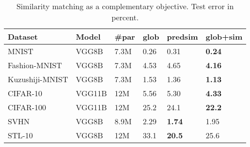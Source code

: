 \documentclass{article}
\begin{document}
\begin{table}[h]
  \caption{Similarity matching as a complementary objective. Test error in percent.}
  \label{table:complementary_sim}
  \centering
  \begin{tabular}{llllll}
    \toprule
    Dataset   & Model & \#par & glob & predsim & glob+sim  \\
    \midrule
    MNIST           & VGG8B & 7.3M & 0.26  & 0.31 & \textbf{0.24} \\
    Fashion-MNIST   & VGG8B & 7.3M & 4.53  & 4.65 & \textbf{4.16} \\
    Kuzushiji-MNIST & VGG8B & 7.3M & 1.53  & 1.36 & \textbf{1.13} \\
    CIFAR-10        & VGG11B & 12M & 5.56  & 5.30 & \textbf{4.33} \\
    CIFAR-100       & VGG11B & 12M & 25.2  & 24.1 & \textbf{22.2} \\
    SVHN            & VGG8B & 8.9M & 2.29  & \textbf{1.74} & 1.95 \\
    STL-10          & VGG8B & 12M  & 33.1  & \textbf{20.5} & 25.6 \\
    \bottomrule
  \end{tabular}
\end{table}
\end{document}
